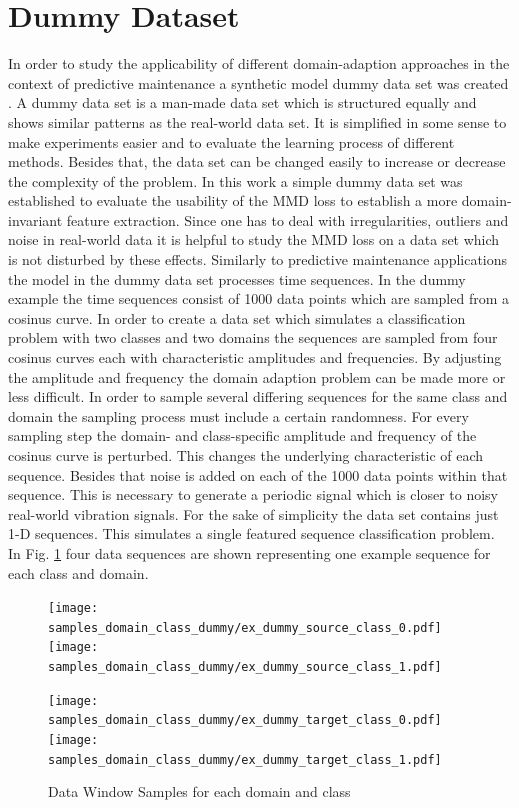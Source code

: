 \section{Dummy Dataset}
In order to study the applicability of different domain-adaption approaches in the context of predictive maintenance a synthetic model dummy data set
was created . A dummy data set is a man-made data set which is structured equally and shows similar patterns as the real-world data set. It is simplified in some sense to make experiments easier and to evaluate the learning process of different methods. Besides that, the data set can be changed easily to increase or decrease the complexity of the problem. In this work a simple dummy data set was established to evaluate the usability of the MMD loss to establish a more domain-invariant feature extraction. Since one has to deal with irregularities, outliers and noise in real-world data it is helpful to study the MMD loss on a data set which is not disturbed by these effects. Similarly to predictive maintenance applications the model in the dummy data set processes time sequences. In the dummy example the time sequences consist of 1000 data points which are sampled from a cosinus curve. In order to create a data set which simulates a classification problem with two classes and two domains the sequences are sampled from four cosinus curves each with characteristic amplitudes and frequencies. By adjusting the amplitude and frequency the domain adaption problem can be made more or less difficult. In order to sample several differing sequences for the same class and domain the sampling process must include a certain randomness. For every sampling step the domain- and class-specific amplitude and frequency of the cosinus curve is perturbed. This changes the underlying characteristic of each sequence. Besides that noise is added on each of the 1000 data points within that sequence. This is necessary to generate a periodic signal which is closer to noisy real-world vibration signals. For the sake of simplicity the data set contains just 1-D sequences. This simulates a single featured sequence classification problem. In Fig. \ref{fig:samples_domain_class_dummy} four data sequences are shown representing one example sequence for each class and domain. 

\begin{figure}[p]
  \centering
  \texttt{[image: samples\_domain\_class\_dummy/ex\_dummy\_source\_class\_0.pdf]}
  \hspace{.3cm}
  \texttt{[image: samples\_domain\_class\_dummy/ex\_dummy\_source\_class\_1.pdf]}

  \vspace{.1cm}

  \texttt{[image: samples\_domain\_class\_dummy/ex\_dummy\_target\_class\_0.pdf]}
  \hspace{.3cm}
  \texttt{[image: samples\_domain\_class\_dummy/ex\_dummy\_target\_class\_1.pdf]}

  \caption{Data Window Samples for each domain and class}
  \label{fig:samples_domain_class_dummy}
\end{figure}


